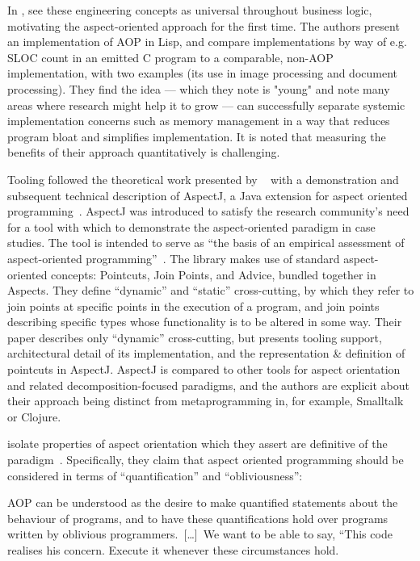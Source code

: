 In \cite{kiczales1997aspect}, \citeauthor{kiczales1997aspect} see these
engineering concepts as universal throughout business logic, motivating the
aspect-oriented approach for the first time. The authors present an
implementation of AOP in Lisp, and compare implementations by way of e.g. SLOC
count in an emitted C program to a comparable, non-AOP implementation, with two
examples (its use in image processing and document processing). They find the
idea --- which they note is "young" and note many areas where research might
help it to grow --- can successfully separate systemic implementation concerns
such as memory management in a way that reduces program bloat and simplifies
implementation. It is noted that measuring the benefits of their approach
quantitatively is challenging.

Tooling followed the theoretical work presented by
\citeauthor{kiczales1997aspect}~\cite{kiczales1997aspect} with a demonstration
and subsequent technical description of AspectJ, a Java extension for aspect
oriented programming~\cite{AspectJLanguageAndTools,aspectj_intro}. AspectJ was
introduced to satisfy the research community's need for a tool with which to
demonstrate the aspect-oriented paradigm in case studies. The tool is intended
to serve as ``the basis of an empirical assessment of aspect-oriented
programming''~\cite{aspectj_intro}. The library makes use of standard
aspect-oriented concepts: Pointcuts, Join Points, and Advice, bundled together
in Aspects. They define ``dynamic'' and ``static'' cross-cutting, by which they
refer to join points at specific points in the execution of a program, and join
points describing specific types whose functionality is to be altered in some
way. Their paper describes only ``dynamic'' cross-cutting, but presents tooling
support, architectural detail of its implementation, and the representation \&
definition of pointcuts in AspectJ. AspectJ is compared to other tools for
aspect orientation and related decomposition-focused paradigms, and the authors
are explicit about their approach being distinct from metaprogramming in, for
example, Smalltalk or Clojure.

\citeauthor{filman2000aspect} isolate properties of aspect orientation which
they assert are definitive of the paradigm~\cite{filman2000aspect}.
Specifically, they claim that aspect oriented programming should be considered
in terms of ``quantification'' and ``obliviousness'':

\begin{displayquote}
AOP can be understood as the desire to make quantified statements about the
behaviour of programs, and to have these quantifications hold over programs
written by oblivious programmers.~[\ldots{}]~We want to be able to say, ``This
code realises his concern. Execute it whenever these circumstances hold.
\end{displayquote}

